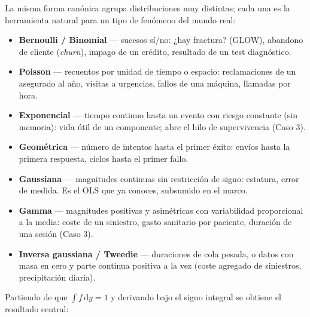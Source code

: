 \documentclass[
  letterpaper,
  DIV=11,
  numbers=noendperiod]{scrartcl}
\providecommand{\tightlist}{%
  \setlength{\itemsep}{0pt}\setlength{\parskip}{0pt}}\usepackage{longtable,booktabs,array}
\begin{document}
\begin{tcolorbox}[enhanced jigsaw, coltitle=black, rightrule=.15mm, arc=.35mm, leftrule=.75mm, colback=white, colbacktitle=quarto-callout-note-color!10!white, left=2mm, breakable, toptitle=1mm, toprule=.15mm, bottomtitle=1mm, titlerule=0mm, title=\textcolor{quarto-callout-note-color}{\faInfo}\hspace{0.5em}{Quién vive en esta familia (y para qué sirve)}, bottomrule=.15mm, opacityback=0, opacitybacktitle=0.6, colframe=quarto-callout-note-color-frame]

La misma forma canónica agrupa distribuciones muy distintas; cada una es
la herramienta natural para un tipo de fenómeno del mundo real:

\begin{itemize}
\tightlist
\item
  \textbf{Bernoulli / Binomial} --- sucesos sí/no: ¿hay fractura?
  (GLOW), abandono de cliente (\emph{churn}), impago de un crédito,
  resultado de un test diagnóstico.
\item
  \textbf{Poisson} --- recuentos por unidad de tiempo o espacio:
  reclamaciones de un asegurado al año, visitas a urgencias, fallos de
  una máquina, llamadas por hora.
\item
  \textbf{Exponencial} --- tiempo continuo hasta un evento con riesgo
  constante (sin memoria): vida útil de un componente; abre el hilo de
  supervivencia (Caso 3).
\item
  \textbf{Geométrica} --- número de intentos hasta el primer éxito:
  envíos hasta la primera respuesta, ciclos hasta el primer fallo.
\item
  \textbf{Gaussiana} --- magnitudes continuas sin restricción de signo:
  estatura, error de medida. Es el OLS que ya conoces, subsumido en el
  marco.
\item
  \textbf{Gamma} --- magnitudes positivas y asimétricas con variabilidad
  proporcional a la media: coste de un siniestro, gasto sanitario por
  paciente, duración de una sesión (Caso 3).
\item
  \textbf{Inversa gaussiana / Tweedie} --- duraciones de cola pesada, o
  datos con masa en cero y parte continua positiva a la vez (coste
  agregado de siniestros, precipitación diaria).
\end{itemize}

\end{tcolorbox}

Partiendo de que \(\int f\,\mathrm{d}y=1\) y derivando bajo el signo
integral se obtiene el resultado central:
\end{document}
